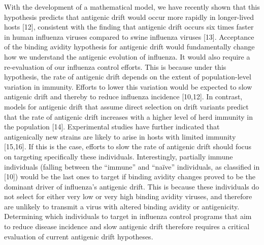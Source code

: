 \documentclass[12pt,a4paper]{article}
\begin{document}
With the development of a mathematical model, we have recently shown that this hypothesis predicts that antigenic drift would occur more rapidly in longer-lived hosts [12], consistent with the finding that antigenic drift occurs six times faster in human influenza viruses compared to swine influenza viruses [13]. Acceptance of the binding avidity hypothesis for antigenic drift would fundamentally change how we understand the antigenic evolution of influenza. It would also require a re-evaluation of our influenza control efforts. This is because under this hypothesis, the rate of antigenic drift depends on the extent of population-level variation in immunity. Efforts to lower this variation would be expected to slow antigenic drift and thereby to reduce influenza incidence [10,12]. In contrast, models for antigenic drift that assume direct selection on drift variants predict that the rate of antigenic drift increases with a higher level of herd immunity in the population [14]. Experimental studies have further indicated that antigenically new strains are likely to arise in hosts with limited immunity [15,16]. If this is the case, efforts to slow the rate of antigenic drift should focus on targeting specifically these individuals. Interestingly, partially immune individuals (falling between the “immune” and “naïve” individuals, as classified in [10]) would be the last ones to target if binding avidity changes proved to be the dominant driver of influenza’s antigenic drift. This is because these individuals do not select for either very low or very high binding avidity viruses, and therefore are unlikely to transmit a virus with altered binding avidity or antigenicity. Determining which individuals to target in influenza control programs that aim to reduce disease incidence and slow antigenic drift therefore requires a critical evaluation of current antigenic drift hypotheses.
\end{document}
